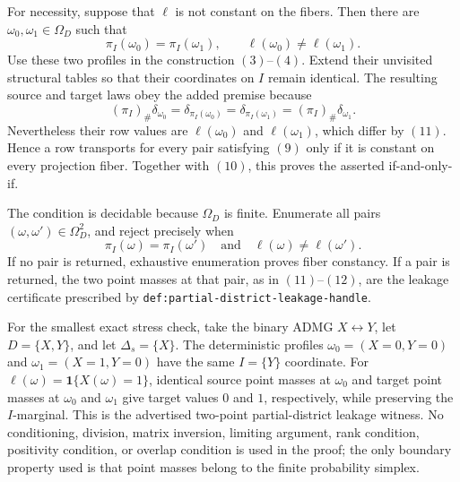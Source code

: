 For necessity, suppose that \(\ell\) is not constant on the fibers.  Then
there are \(\omega_0,\omega_1\in\Omega_D\) such that
\[
\pi_I(\omega_0)=\pi_I(\omega_1),
\qquad
\ell(\omega_0)\ne\ell(\omega_1).
\tag{11}
\]
Use these two profiles in the construction \((3)\)--\((4)\).  Extend their
unvisited structural tables so that their coordinates on \(I\) remain
identical.  The resulting source and target laws obey the added premise
because
\[
(\pi_I)_\#\delta_{\omega_0}
=\delta_{\pi_I(\omega_0)}
=\delta_{\pi_I(\omega_1)}
=(\pi_I)_\#\delta_{\omega_1}.
\tag{12}
\]
Nevertheless their row values are \(\ell(\omega_0)\) and
\(\ell(\omega_1)\), which differ by \((11)\).  Hence a row transports for
every pair satisfying \((9)\) only if it is constant on every projection
fiber.  Together with \((10)\), this proves the asserted if-and-only-if.

The condition is decidable because \(\Omega_D\) is finite.  Enumerate all
pairs \((\omega,\omega')\in\Omega_D^2\), and reject precisely when
\[
\pi_I(\omega)=\pi_I(\omega')
\quad\text{and}\quad
\ell(\omega)\ne\ell(\omega').
\tag{13}
\]
If no pair is returned, exhaustive enumeration proves fiber constancy.  If
a pair is returned, the two point masses at that pair, as in
\((11)\)--\((12)\), are the leakage certificate prescribed by
\texttt{def:partial-district-leakage-handle}.

For the smallest exact stress check, take the binary ADMG
\(X\leftrightarrow Y\), let \(D=\{X,Y\}\), and let
\(\Delta_s=\{X\}\).  The deterministic profiles
\(\omega_0=(X=0,Y=0)\) and \(\omega_1=(X=1,Y=0)\) have the same
\(I=\{Y\}\) coordinate.  For
\(\ell(\omega)=\mathbf 1\{X(\omega)=1\}\), identical source point masses
at \(\omega_0\) and target point masses at \(\omega_0\) and \(\omega_1\)
give target values \(0\) and \(1\), respectively, while preserving the
\(I\)-marginal.  This is the advertised two-point partial-district leakage
witness.  No conditioning, division, matrix inversion, limiting argument,
rank condition, positivity condition, or overlap condition is used in the
proof; the only boundary property used is that point masses belong to the
finite probability simplex.